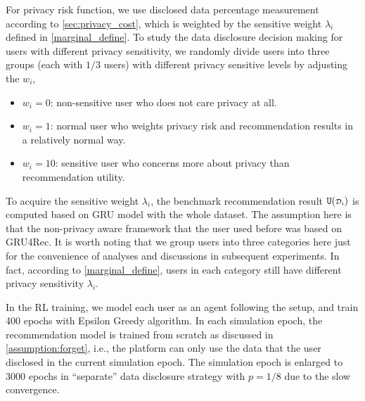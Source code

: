 For privacy risk function, we use disclosed data percentage measurement according to \cref{sec:privacy_cost}, which is weighted by the sensitive weight $\lambda_i$ defined in \cref{marginal_define}.
To study the data disclosure decision making for users with different privacy sensitivity, we randomly divide users into three groups (each with $1/3$ users) with different privacy sensitive levels by adjusting the $w_i$, 
\begin{itemize} %
    \item $w_i = 0$: non-sensitive user who does not care privacy at all.
    \item $w_i = 1$: normal user who weights privacy risk and recommendation results in a relatively normal way.  
    \item $w_i = 10$: sensitive user who concerns more about privacy than recommendation utility.
\end{itemize}
To acquire the sensitive weight $\lambda_i$, the benchmark recommendation result $\texttt{U}({\scriptstyle \mathcal{D}_i})$ is computed based on GRU model with the whole dataset.
The assumption here is that the non-privacy aware framework that the user used before was based on GRU4Rec.
It is worth noting that we group users into three categories here just for the convenience of analyses and discussions in subsequent experiments.
In fact, according to \cref{marginal_define}, users in each category still have different privacy sensitivity $\lambda_i$.  

In the RL training, we model each user as an agent following the setup, and train 400 epochs with Epsilon Greedy algorithm. 
In each simulation epoch, the recommendation model is trained from scratch as discussed in \cref{assumption:forget}, i.e., the platform can only use the data that the user disclosed in the current simulation epoch.
The simulation epoch is enlarged to 3000 epochs in
``separate'' data disclosure strategy with $p=1/8$ due to the slow convergence.

